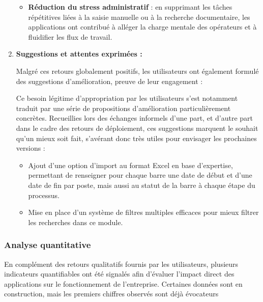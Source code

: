 \documentclass[11pt,a4paper]{article}
\begin{document}
\begin{enumerate}
\begin{itemize}
    \item \textbf{Réduction du stress administratif} : en supprimant les tâches répétitives liées à la saisie manuelle ou à la recherche documentaire, les applications ont contribué à alléger la charge mentale des opérateurs et à fluidifier les flux de travail.
\end{itemize}

\item \textbf{Suggestions et attentes exprimées :}

Malgré ces retours globalement positifs, les utilisateurs ont également formulé des suggestions d’amélioration, preuve de leur engagement :

Ce besoin légitime d’appropriation par les utilisateurs s’est notamment traduit par une série de propositions d’amélioration particulièrement concrètes. Recueillies lors des échanges informels d’une part, et d’autre part dans le cadre des retours de déploiement, ces suggestions marquent le souhait qu’un mieux soit fait, s’avérant donc très utiles pour envisager les prochaines versions : 

	\begin{itemize}
    		\item Ajout d’une option d’import au format Excel en base d’expertise, permettant de renseigner pour chaque barre une date de début et d'une date de fin par poste, mais aussi au statut de la barre à chaque étape du processus.
    		\item Mise en place d'un système de filtres multiples efficaces pour mieux filtrer les recherches dans ce module.
     
\end{itemize}
\end{enumerate}


\subsubsection{Analyse quantitative}
En complément des retours qualitatifs fournis par les utilisateurs, plusieurs indicateurs quantifiables ont été signalés afin d’évaluer l’impact direct des applications sur le fonctionnement de l’entreprise. Certaines données sont en construction, mais les premiers chiffres observés sont déjà évocateurs
\end{document}
